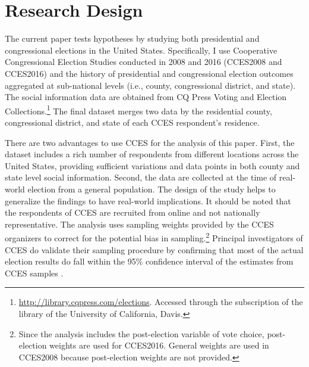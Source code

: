 \documentclass[doc,natbib,12pt]{apa6}\usepackage[]{graphicx}\usepackage[]{color}
\begin{document}
    \section{Research Design}
    
    
    \par The current paper tests hypotheses by studying both presidential and congressional elections in the United States. Specifically, I use Cooperative Congressional Election Studies conducted in 2008 and 2016 (CCES2008 and CCES2016) and the history of presidential and congressional election outcomes aggregated at sub-national levels (i.e., county, congressional district, and state). The social information data are obtained from CQ Press Voting and Election Collections.\footnote{\url{http://library.cqpress.com/elections}. Accessed through the subscription of the library of the University of California, Davis.} The final dataset merges two data by the residential county, congressional district, and state of each CCES respondent's residence. 
     
    \par There are two advantages to use CCES for the analysis of this paper. First, the dataset includes a rich number of respondents from different locations across the United States, providing sufficient variations and data points in both county and state level social information. Second, the data are collected at the time of real-world election from a general population. The design of the study helps to generalize the findings to have real-world implications. It should be noted that the respondents of CCES are recruited from online and not nationally representative. The analysis uses sampling weights provided by the CCES organizers to correct for the potential bias in sampling.\footnote{Since the analysis includes the post-election variable of vote choice, post-election weights are used for CCES2016. General weights are used in CCES2008 because post-election weights are not provided.} Principal investigators of CCES do validate their sampling procedure by confirming that most of the actual election results do fall within the 95\% confidence interval of the estimates from CCES samples \cite{Ansolabehere2011guto, Ansolabehere2017guto}.  
    
\end{document}
